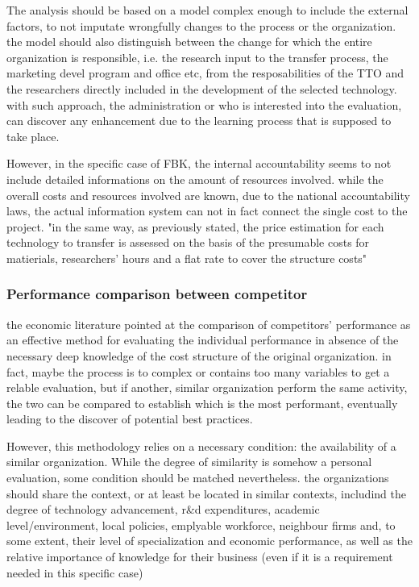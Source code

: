 The analysis should be based on a model complex enough to include the external factors, to not imputate wrongfully changes to the process or the organization. the model should also distinguish between the change for which the entire organization is responsible, i.e. the research input to the transfer process, the marketing devel program and office etc, from the resposabilities of the TTO and the researchers directly included in the development of the selected technology. with such approach, the administration or who is interested into the evaluation, can discover any enhancement due to the learning process that is supposed to take place. 

However, in the specific case of FBK, the internal accountability seems to not include detailed informations on the amount of resources involved. while the overall costs and resources involved are known, due to the national accountability laws, the actual information system can not in fact connect the single cost to the project. "in the same way, as previously stated, the price estimation for each technology to transfer is assessed on the basis of the presumable costs for matierials, researchers' hours and a flat rate to cover the structure costs"

\subsubsection{Performance comparison between competitor}

the economic literature pointed at the comparison of competitors' performance as an effective method for evaluating the individual performance in absence of the necessary deep knowledge of the cost structure of the original organization. in fact, maybe the process is to complex or contains too many variables to get a relable evaluation, but if another, similar organization perform the same activity, the two can be compared to establish which is the most performant, eventually leading to the discover of potential best practices.

However, this methodology relies on a necessary condition: the availability of a similar organization. While the degree of similarity is somehow a personal evaluation, some condition should be matched nevertheless. the organizations should share the context, or at least be located in similar contexts, includind the degree of technology advancement, r\&d expenditures, academic level/environment, local policies, emplyable workforce, neighbour firms and, to some extent, their level of specialization and economic performance, as well as the relative importance of knowledge for their business (even if it is a requirement needed in this specific case)

